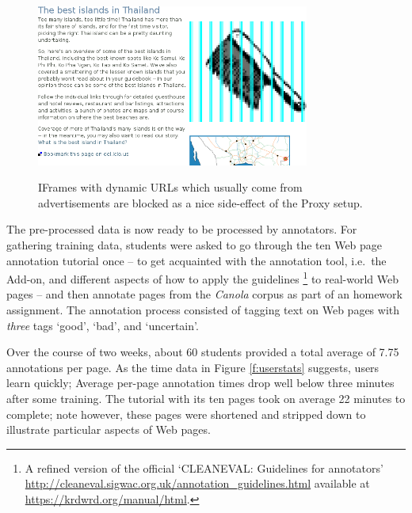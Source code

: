 \begin{figure}
	{\includegraphics[width=0.8\textwidth]{add}}
\caption{\label{f:iframes}IFrames with dynamic URLs which usually come from advertisements are blocked as a nice side-effect of the Proxy setup.}
\end{figure}

The pre-processed data is now ready to be processed by annotators.
For gathering training data, students were asked to go through the ten Web page annotation tutorial once
-- to get acquainted with the annotation tool, i.e.~the Add-on, and different aspects of how to apply the guidelines 
\footnote{A refined version of the official `CLEANEVAL: Guidelines for annotators' \url{http://cleaneval.sigwac.org.uk/annotation_guidelines.html} available at \url{https://krdwrd.org/manual/html}.}
to real-world Web pages -- 
and then annotate pages from the \textit{Canola} corpus as part of an homework assignment.
The annotation process consisted of tagging text on Web pages with \emph{three} tags `good', `bad', and `uncertain'.

Over the course of two weeks, about 60 students provided a total average of 7.75 annotations per page.
As the time data in Figure \ref{f:userstats} suggests, users learn quickly; 
Average per-page annotation times drop well below three minutes after some training.
The tutorial with its ten pages took on average 22 minutes to complete;
note however, these pages were shortened and stripped down to illustrate particular aspects of Web pages.

